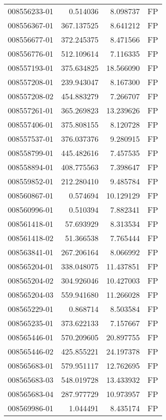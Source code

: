 \begin{tabular}{lrrl}
008556233-01 &    0.514036 &     8.098737 &   FP \\
008556367-01 &  367.137525 &     8.641212 &   FP \\
008556677-01 &  372.245375 &     8.471566 &   FP \\
008556776-01 &  512.109614 &     7.116335 &   FP \\
008557193-01 &  375.634825 &    18.566090 &   FP \\
008557208-01 &  239.943047 &     8.167300 &   FP \\
008557208-02 &  454.883279 &     7.266707 &   FP \\
008557261-01 &  365.269823 &    13.239626 &   FP \\
008557406-01 &  375.808155 &     8.120728 &   FP \\
008557537-01 &  376.037376 &     9.280915 &   FP \\
008558799-01 &  445.482616 &     7.457535 &   FP \\
008558894-01 &  408.775563 &     7.398647 &   FP \\
008559852-01 &  212.280410 &     9.485784 &   FP \\
008560867-01 &    0.574694 &    10.129129 &   FP \\
008560996-01 &    0.510394 &     7.882341 &   FP \\
008561418-01 &   57.693929 &     8.313534 &   FP \\
008561418-02 &   51.366538 &     7.765444 &   FP \\
008563841-01 &  267.206164 &     8.066992 &   FP \\
008565204-01 &  338.048075 &    11.437851 &   FP \\
008565204-02 &  304.926046 &    10.427003 &   FP \\
008565204-03 &  559.941680 &    11.266028 &   FP \\
008565229-01 &    0.868714 &     8.503584 &   FP \\
008565235-01 &  373.622133 &     7.157667 &   FP \\
008565446-01 &  570.209605 &    20.897755 &   FP \\
008565446-02 &  425.855221 &    24.197378 &   FP \\
008565683-01 &  579.951117 &    12.762695 &   FP \\
008565683-03 &  548.019728 &    13.433932 &   FP \\
008565683-04 &  287.977729 &    10.973957 &   FP \\
008569986-01 &    1.044491 &     8.435174 &   FP \\

\end{tabular}
